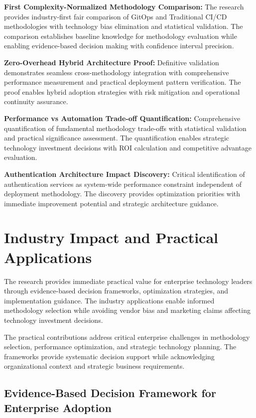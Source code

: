 \textbf{First Complexity-Normalized Methodology Comparison:}
The research provides industry-first fair comparison of GitOps and Traditional CI/CD methodologies with technology bias elimination and statistical validation. The comparison establishes baseline knowledge for methodology evaluation while enabling evidence-based decision making with confidence interval precision.

\textbf{Zero-Overhead Hybrid Architecture Proof:}
Definitive validation demonstrates seamless cross-methodology integration with comprehensive performance measurement and practical deployment pattern verification. The proof enables hybrid adoption strategies with risk mitigation and operational continuity assurance.

\textbf{Performance vs Automation Trade-off Quantification:}
Comprehensive quantification of fundamental methodology trade-offs with statistical validation and practical significance assessment. The quantification enables strategic technology investment decisions with ROI calculation and competitive advantage evaluation.

\textbf{Authentication Architecture Impact Discovery:}
Critical identification of authentication services as system-wide performance constraint independent of deployment methodology. The discovery provides optimization priorities with immediate improvement potential and strategic architecture guidance.

\section{Industry Impact and Practical Applications}
\label{sec:industry_impact}

The research provides immediate practical value for enterprise technology leaders through evidence-based decision frameworks, optimization strategies, and implementation guidance. The industry applications enable informed methodology selection while avoiding vendor bias and marketing claims affecting technology investment decisions.

The practical contributions address critical enterprise challenges in methodology selection, performance optimization, and strategic technology planning. The frameworks provide systematic decision support while acknowledging organizational context and strategic business requirements.

\subsection{Evidence-Based Decision Framework for Enterprise Adoption}
\label{subsec:decision_framework}

